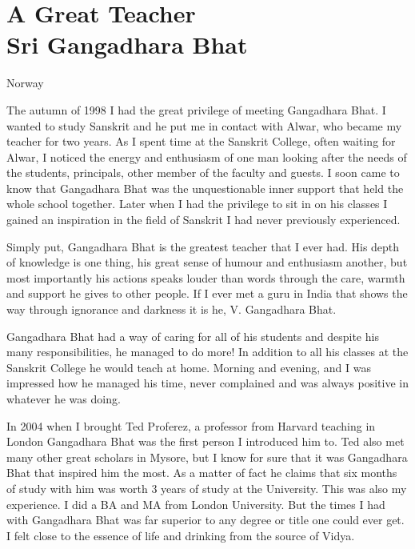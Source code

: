 \chapter[A Great Teacher Sri Gangadhara Bhat]{A Great Teacher \\Sri Gangadhara Bhat}

\begin{center}

\smallskip

Norway
\addrule
\end{center}

The autumn of 1998 I had the great privilege of meeting Gangadhara Bhat. I wanted to study Sanskrit and he put me in contact with Alwar, who became my teacher for two years. As I spent time at the Sanskrit College, often waiting for Alwar, I noticed the energy and enthusiasm of one man looking after the needs of the students, principals, other member of the faculty and guests. I soon came to know that Gangadhara Bhat was the unquestionable inner support that held the whole school together. Later when I had the privilege to sit in on his classes I gained an inspiration in the field of Sanskrit I had never previously experienced.

Simply put, Gangadhara Bhat is the greatest teacher that I ever had. His depth of knowledge is one thing, his great sense of humour and enthusiasm another, but most importantly his actions speaks louder than words through the care, warmth and support he gives to other people. If I ever met a guru in India that shows the way through ignorance and darkness it is he, V. Gangadhara Bhat.

Gangadhara Bhat had a way of caring for all of his students and despite his many responsibilities, he managed to do more! In addition to all his classes at the Sanskrit College he would teach at home. Morning and evening, and I was impressed how he managed his time, never complained and was always positive in whatever he was doing.
\vskip 2pt

In 2004 when I brought Ted Proferez, a professor from Harvard teaching in London Gangadhara Bhat was the first person I introduced him to. Ted also met many other great scholars in Mysore, but I know for sure that it was Gangadhara Bhat that inspired him the most. As a matter of fact he claims that six months of study with him was worth 3 years of study at the University. This was also my experience. I did a BA and MA from London University. But the times I had with Gangadhara Bhat was far superior to any degree or title one could ever get. I felt close to the essence of life and drinking from the source of Vidya.
\vskip 2pt

